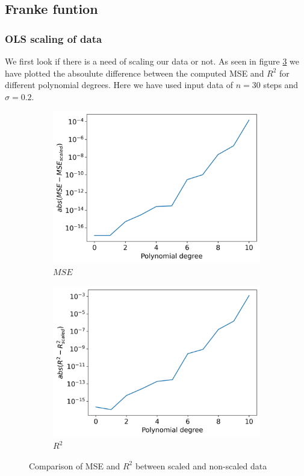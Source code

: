 \documentclass[12pt]{article}
\begin{document}
\subsection{Franke funtion}
\subsubsection{OLS scaling of data}
We first look if there is a need of scaling our data or not. As seen in figure \ref{fig:compare_scale} we have plotted the absoulute difference between the computed MSE and $R^2$ for different polynomial degrees. Here we have used input data of $n=30$ steps and $\sigma=0.2$.
\begin{figure}[H]
  \begin{subfigure}{.5\textwidth}
    \centering
    \includegraphics[width=\textwidth]{../figures/compare_scale_mse.png}
    \caption{$MSE$}
    \label{fig:}
  \end{subfigure}
  \begin{subfigure}{.5\textwidth}
    \centering
    \includegraphics[width=\textwidth]{../figures/compare_scale_r2.png}
    \caption{$R^2$}
    \label{fig:}
  \end{subfigure}
  \caption{Comparison of MSE and $R^2$ between scaled and non-scaled data}
  \label{fig:compare_scale}
\end{figure}
\end{document}
